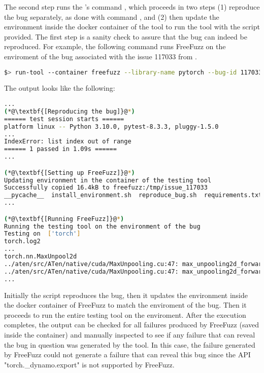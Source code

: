 \documentclass[sigconf,screen]{acmart}
\begin{document}
The second step runs the \tname's command , which
proceeds in two steps (1) reproduce the bug separately, as done with
command , and (2) then update the environment inside
the docker container of the tool to run the tool with the script
provided. The first step is a sanity check to assure that the bug can
indeed be reproduced. For example, the following command runs FreeFuzz
on the enviroment of the bug associated with the issue 117033 from
\torch.

\begin{lstlisting}[language=bash,basicstyle=\small,keywords={}]
$> run-tool --container freefuzz --library-name pytorch --bug-id 117033 --run-script tool-integration/FreeFuzz/run_freefuzz_docker.sh
\end{lstlisting}

The output looks like the following:

\begin{lstlisting}[language=bash,basicstyle=\small,keywords={}]
...  
(*@\textbf{[Reproducing the bug]}@*)
====== test session starts ======
platform linux -- Python 3.10.0, pytest-8.3.3, pluggy-1.5.0
...
IndexError: list index out of range
====== 1 passed in 1.09s ======
...

(*@\textbf{[Setting up FreeFuzz]}@*)
Updating environment in the container of the testing tool
Successfully copied 16.4kB to freefuzz:/tmp/issue_117033
__pycache__  install_environment.sh  reproduce_bug.sh  requirements.txt  test_issue_117033.py
...

(*@\textbf{[Running FreeFuzz]}@*)
Running the testing tool on the environment of the bug
Testing on  ['torch']
torch.log2
...
torch.nn.MaxUnpool2d
../aten/src/ATen/native/cuda/MaxUnpooling.cu:47: max_unpooling2d_forward_kernel: block: [0,0,0], thread: [1,0,0] Assertion `maxind >= 0 && maxind < outputImageSize` failed.
../aten/src/ATen/native/cuda/MaxUnpooling.cu:47: max_unpooling2d_forward_kernel: block: [0,0,0], thread: [2,0,0] Assertion `maxind >= 0 && maxind < outputImageSize` failed.
...
\end{lstlisting}

Initially the script reproduces the bug, then it updates the environment inside the docker container of FreeFuzz to match the enviroment of the bug. Then it proceeds to run the entire testing tool on the enviroment. After the execution completes, the output can be checked for all failures produced by FreeFuzz (saved inside the container) and manually inspected to see if any failure that can reveal the bug in question was generated by the tool. In this case, the failure generated by FreeFuzz could not generate a failure that can reveal this bug since the API "torch.\_dynamo.export" is not supported by FreeFuzz.
\end{document}
